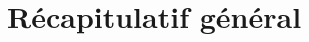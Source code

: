 \documentclass{article}
\newcommand{\lfa}{\lambda_{F, A}}
\newcommand{\marc}[1]{\textcolor{red}{#1}}
\begin{document}
%
%
%

\section{Récapitulatif général}
\end{document}
